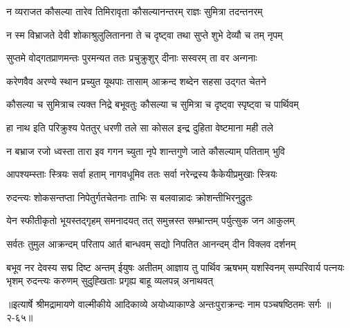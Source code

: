 \twolineshloka
{न व्यराजत कौसल्या तारेव तिमिरावृता}
{कौसल्यानन्तरम् राज्ञः सुमित्रा तदन्तनरम्} %

\twolineshloka
{न स्म विभ्राजते देवी शोकाश्रुलुलितानना}
{ते च दृष्ट्वा तथा सुप्ते शुभे देव्यौ च तम् नृपम्} %

\twolineshloka
{सुप्तमे वोद्गतप्राणमन्तः पुरमन्यत}
{ततः प्रचुक्रुशुर् दीनाः सस्वरम् ता वर अन्गनाः} %

\twolineshloka
{करेणवैव अरण्ये स्थान प्रच्युत यूथपाः}
{तासाम् आक्रन्द शब्देन सहसा उद्गत चेतने} %

\twolineshloka
{कौसल्या च सुमित्राच त्यक्त निद्रे बभूवतुः}
{कौसल्या च सुमित्रा च दृष्ट्वा स्पृष्ट्वा च पार्थिवम्} %

\twolineshloka
{हा नाथ इति परिक्रुश्य पेततुर् धरणी तले}
{सा कोसल इन्द्र दुहिता वेष्टमाना मही तले} %

\twolineshloka
{न बभ्राज रजो ध्वस्ता तारा इव गगन च्युता}
{नृपे शान्तगुणे जाते कौसल्याम् पतिताम् भुवि} %

\twolineshloka
{आपश्यम्स्ताः स्त्रियः सर्वा हताम् नागवधूमिव}
{ततः सर्वा नरेन्द्रस्य कैकेयीप्रमुखाः स्त्रियः} %

\twolineshloka
{रुदन्त्यः शोकसन्तप्ता निपेतुर्गतचेतनाः}
{ताभिः स बलवान्नादः क्रोशन्तीभिरनुद्रुतः} %

\twolineshloka
{येन स्फीतीकृतो भूयस्तद्गृहम् समनादयत्}
{तत् समुत्त्रस्त सम्भ्रान्तम् पर्युत्सुक जन आकुलम्} %

\twolineshloka
{सर्वतः तुमुल आक्रन्दम् परिताप आर्त बान्धवम्}
{सद्यो निपतित आनन्दम् दीन विक्लव दर्शनम्} %

\twolineshloka
{बभूव नर देवस्य सद्म दिष्ट अन्तम् ईयुषः}
{अतीतम् आज्ञाय तु पार्थिव ऋषभम्}
{यशस्विनम् सम्परिवार्य पत्नयः}
{भृशम् रुदन्त्यः करुणम् सुदुह्खिताः}
{प्रगृह्य बाहू व्यलपन्न् अनाथवत्} %


॥इत्यार्षे श्रीमद्रामायणे वाल्मीकीये आदिकाव्ये अयोध्याकाण्डे अन्तःपुराक्रन्दः नाम पञ्चषष्ठितमः सर्गः ॥२-६५॥
